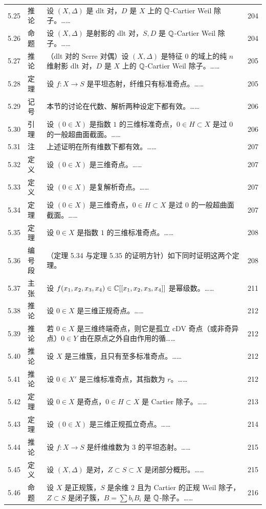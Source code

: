 \begin{longtable}{@{}p{}p{}p{}p{}@{}}
5.25 & 推论 & 设 $(X,\Delta)$ 是 dlt 对，$D$ 是 $X$ 上的 $\mathbb{Q}$-Cartier Weil 除子。…… & 204 \\
5.26 & 命题 & 设 $(X,\Delta)$ 是射影的 dlt 对，$S,D$ 是 $\mathbb{Q}$-Cartier Weil 除子。…… & 204 \\
5.27 & 推论 & （dlt 对的 Serre 对偶）设 $(X,\Delta)$ 是特征 $0$ 的域上的纯 $n$ 维射影 dlt 对，$D$ 是 $X$ 上的 $\mathbb{Q}$-Cartier Weil 除子。…… & 205 \\
5.28 & 定理 & 设 $f\colon X\to S$ 是平坦态射，纤维只有标准奇点。…… & 205 \\
5.29 & 记号 & 本节的讨论在代数、解析两种设定下都有效。…… & 206 \\
5.30 & 引理 & 设 $(0\in X)$ 是指数 $1$ 的三维标准奇点，$0\in H\subset X$ 是过 $0$ 的一般超曲面截面。…… & 206 \\
5.31 & 注 & 上述证明在所有维数下都有效。…… & 207 \\
5.32 & 定义 & 设 $(0\in X)$ 是三维奇点。…… & 207 \\
5.33 & 定义 & 设 $(0\in X)$ 是复解析奇点。…… & 207 \\
5.34 & 定理 & 设 $(0\in X)$ 是三维奇点，$0\in H\subset X$ 是过 $0$ 的一般超曲面截面。…… & 207 \\
5.35 & 定理 & 设 $0\in X$ 是指数 $1$ 的三维标准奇点。…… & 208 \\
5.36 & 编号段 & （定理 5.34 与定理 5.35 的证明方针）\quad 如下同时证明这两个定理。 & 208 \\
5.37 & 主张 & 设 $f(x_1,x_2,x_3,x_4)\in\mathbb{C}[[x_1,x_2,x_3,x_4]]$ 是幂级数。…… & 211 \\
5.38 & 推论 & 设 $0\in X$ 是三维正规奇点。…… & 212 \\
5.39 & 推论 & 若 $0\in X$ 是三维终端奇点，则它是孤立 cDV 奇点（或非奇异点）$0\in Y$ 由在原点之外自由作用的循…… & 212 \\
5.40 & 推论 & 设 $X$ 是三维簇，且只有至多标准奇点。…… & 212 \\
5.41 & 推论 & 设 $0\in X'$ 是三维标准奇点，其指数为 $r$。…… & 212 \\
5.42 & 定理 & 设 $0\in X$ 是奇点，$0\in H\subset X$ 是 Cartier 除子。…… & 213 \\
5.43 & 定理 & 设 $(0\in X)$ 是三维正规孤立奇点。…… & 214 \\
5.44 & 推论 & 设 $f\colon X\to S$ 是纤维维数为 $3$ 的平坦态射。…… & 215 \\
5.45 & 定义 & 设 $(X,\Delta)$ 是对，$Z\subset S\subset X$ 是闭部分概形。…… & 215 \\
5.46 & 命题 & 设 $X$ 是正规簇，$S$ 是余维 $2$ 且为 Cartier 的正规 Weil 除子，$Z\subset S$ 是闭子簇，$B=\sum b_iB_i$ 是 $\mathbb{Q}$-除子。…… & 216 \\

\end{longtable}
